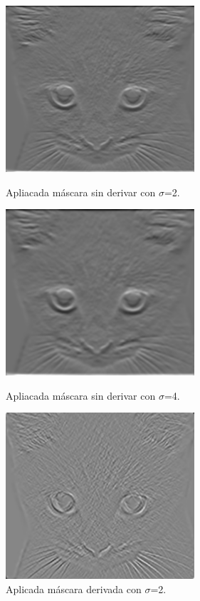 \documentclass[12pt]{article}
\begin{document}
\begin{figure}[H]
\centering
\parbox{7cm}{
\includegraphics[width=7cm]{images/GetDerivKernelsCat2.png}
\caption{Apliacada máscara sin derivar con $\sigma$=2.}
\label{fig:2figsA}}
\qquad
\begin{minipage}{7cm}
\includegraphics[width=7cm]{images/GetDerivKernelsCat4.png}
\caption{Apliacada máscara sin derivar con $\sigma$=4.}
\label{fig:2figsB}
\end{minipage}
\qquad
\begin{minipage}{7cm}
\includegraphics[width=7cm]{images/GetDerivKernelsCatDeriv.png}
\caption{Aplicada máscara derivada con $\sigma$=2.}
\label{fig:2figsB}
\end{minipage}
\qquad
\begin{minipage}{7cm}

\end{minipage}
\end{figure}
\end{document}
